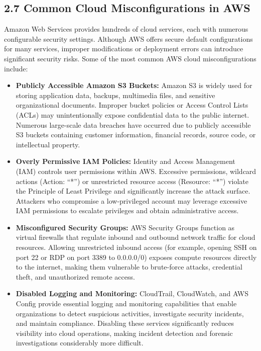 \subsection{2.7 Common Cloud Misconfigurations in AWS}

Amazon Web Services provides hundreds of cloud services, each with numerous configurable security settings. Although AWS offers secure default configurations for many services, improper modifications or deployment errors can introduce significant security risks. Some of the most common AWS cloud misconfigurations include:

\begin{itemize}
\tightlist
\item
  \textbf{Publicly Accessible Amazon S3 Buckets:} Amazon S3 is widely used for storing application data, backups, multimedia files, and sensitive organizational documents. Improper bucket policies or Access Control Lists (ACLs) may unintentionally expose confidential data to the public internet. Numerous large-scale data breaches have occurred due to publicly accessible S3 buckets containing customer information, financial records, source code, or intellectual property.\\
\item
  \textbf{Overly Permissive IAM Policies:} Identity and Access Management (IAM) controls user permissions within AWS. Excessive permissions, wildcard actions (Action: ``*'') or unrestricted resource access (Resource: ``*'') violate the Principle of Least Privilege and significantly increase the attack surface. Attackers who compromise a low-privileged account may leverage excessive IAM permissions to escalate privileges and obtain administrative access.\\
\item
  \textbf{Misconfigured Security Groups:} AWS Security Groups function as virtual firewalls that regulate inbound and outbound network traffic for cloud resources. Allowing unrestricted inbound access (for example, opening SSH on port 22 or RDP on port 3389 to 0.0.0.0/0) exposes compute resources directly to the internet, making them vulnerable to brute-force attacks, credential theft, and unauthorized remote access.\\
\item
  \textbf{Disabled Logging and Monitoring:} CloudTrail, CloudWatch, and AWS Config provide essential logging and monitoring capabilities that enable organizations to detect suspicious activities, investigate security incidents, and maintain compliance. Disabling these services significantly reduces visibility into cloud operations, making incident detection and forensic investigations considerably more difficult.\\

\end{itemize}

